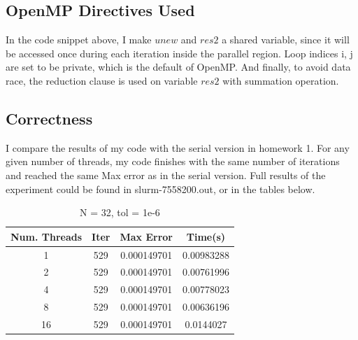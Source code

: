 \documentclass{amsart} %
\begin{document}
\subsection{OpenMP Directives Used}
In the code snippet above, I make $unew$ and $res2$ a shared variable, since it will be accessed once during each iteration inside the parallel region. Loop indices i, j are set to be private, which is the default of OpenMP. And finally, to avoid data race, the reduction clause is used on variable $res2$ with summation operation. 


\subsection{Correctness}

I compare the results of my code with the serial version in homework 1. For any given number of threads, my code finishes with the same number of iterations and reached the same Max error as in the serial version. Full results of the experiment could be found in slurm-7558200.out, or in the tables below.  

\begin{table}[ht]
	\caption{N = 32, tol = 1e-6} %
	\centering %
	\begin{tabular}{c c c c} %
		\hline\hline %
		Num. Threads & Iter & Max Error & Time(s) \\ [0.5ex] %
		\hline %
		1 & 529 & 0.000149701 & 0.00983288 \\ %
		2 & 529 & 0.000149701 & 0.00761996 \\
		4 & 529 & 0.000149701 & 0.00778023 \\
		8 & 529 & 0.000149701 & 0.00636196 \\
		16 & 529 & 0.000149701 & 0.0144027 \\ [1ex] %
		\hline %
	\end{tabular}
	\label{table:nonlin} %
\end{table}
\end{document}
